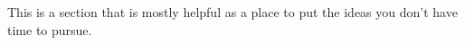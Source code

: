 This is a section that is mostly helpful as a place to put the ideas you don't have time to pursue. 
